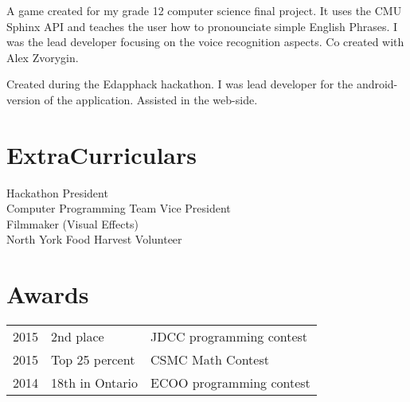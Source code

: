 \documentclass[]{DavidTsenterResume}
\begin{document}
\begin{minipage}[t]{0.66\textwidth}
A game created for my grade 12 computer science final project. It uses the CMU Sphinx API and teaches the user how to pronounciate simple English Phrases. I was the lead developer focusing on the voice recognition aspects. Co created with Alex Zvorygin.\\
\sectionsep

Created during the Edapphack hackathon. I was lead developer for the android-version of the application. Assisted in the web-side. 
\sectionsep
\section{ExtraCurriculars}
\textbullet{} Hackathon President \\
\textbullet{} Computer Programming Team Vice President \\
\textbullet{} Filmmaker (Visual Effects) \\
\textbullet{} North York Food Harvest Volunteer \\
\sectionsep
\sectionsep


\section{Awards} 
\begin{tabular}{rll}
2015	     & 2nd place  & JDCC programming contest\\
2015     & Top 25 percent& CSMC Math Contest\\
2014	     & 18th in Ontario  & ECOO programming contest\\

\end{tabular}
\sectionsep

\end{minipage} 
\end{document}
